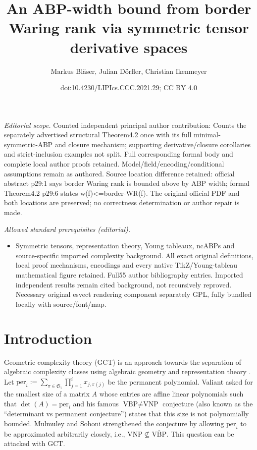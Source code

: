 \documentclass[10pt,a4paper]{article}
\title{An ABP-width bound from border Waring rank via symmetric tensor derivative spaces}
\author{Markus Bläser, Julian Dörfler, Christian Ikenmeyer}
\date{doi:10.4230/LIPIcs.CCC.2021.29; CC BY 4.0}
\numberwithin{equation}{section}
\theoremstyle{definition}
\newcommand{\aS}{\mathfrak{S}}
\newcommand{\per}{\text{per}}
\begin{document}
\maketitle
\noindent\textit{Editorial scope.} Counted independent principal author contribution: Counts the separately advertised structural Theorem4.2 once with its full minimal-symmetric-ABP and closure mechanism; supporting derivative/closure corollaries and strict-inclusion examples not split. Full corresponding formal body and complete local author proofs retained. Model/field/encoding/conditional assumptions remain as authored. Source location difference retained: official abstract p29:1 says border Waring rank is bounded above by ABP width; formal Theorem4.2 p29:6 states w(f)<=border-WR(f). The original official PDF and both locations are preserved; no correctness determination or author repair is made.\par\medskip
\noindent\textit{Allowed standard prerequisites (editorial).}\begin{itemize}
\item Symmetric tensors, representation theory, Young tableaux, ncABPs and source-specific imported complexity background. All exact original definitions, local proof mechanisms, encodings and every native TikZ/Young-tableau mathematical figure retained. Full55 author bibliography entries. Imported independent results remain cited background, not recursively reproved. Necessary original esvect rendering component separately GPL, fully bundled locally with source/font/map.
\end{itemize}\medskip
\section{Introduction}
\label{sec:intro}
Geometric complexity theory (GCT) is an approach towards the separation of algebraic complexity classes using algebraic geometry and representation theory \cite{gct1, gct2, BLMW:11}.
Let $\per_i := \sum_{\pi\in\aS_i} \prod_{j=1}^i x_{j,\pi(j)}$ be the permanent polynomial. Valiant 
asked for the smallest size of a matrix $A$ whose entries are affine linear polynomials such that $\det(A)=\per_i$ and his famous $\text{VBP}\neq\text{VNP}$ conjecture (also known as the ``determinant vs permanent conjecture'') states that this size is not polynomially bounded.
%
%
%
Mulmuley and Sohoni strengthened the conjecture by allowing $\per_i$ to be approximated arbitrarily closely, i.e., $\text{VNP}\not\subseteq\overline{\text{VBP}}$.
This question can be attacked with GCT.
\end{document}
